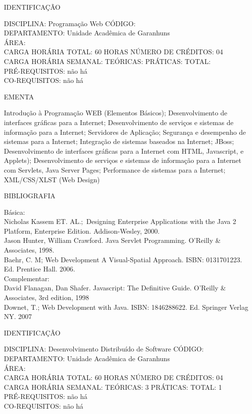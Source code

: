 \documentclass[
	12pt,				%
	openright,			%
  oneside,     %
	a4paper,			%
	chapter=TITLE,		%
	english,			%
	french,				%
	spanish,			%
	brazil				%
	]{abntex2}
\begin{document}
\begin{apendicesenv}
\newpage IDENTIFICAÇÃO

DISCIPLINA: Programação Web CÓDIGO:\\ 
DEPARTAMENTO: Unidade Acadêmica de Garanhuns\\ 
ÁREA: \\
CARGA HORÁRIA TOTAL: 60 HORAS NÚMERO DE CRÉDITOS: 04\\
CARGA HORÁRIA SEMANAL: TEÓRICAS: PRÁTICAS: TOTAL: \\
PRÉ-REQUISITOS: não há\\
CO-REQUISITOS: não há

EMENTA 

Introdução à Programação WEB (Elementos Básicos); Desenvolvimento de interfaces gráficas para a Internet; Desenvolvimento de serviços e sistemas de informação para a Internet; Servidores de Aplicação; Segurança e desempenho de sistemas para a Internet; Integração de sistemas baseados na Internet; JBoss; Desenvolvimento de interfaces gráficas para a Internet com HTML, Javascript, e Applets); Desenvolvimento de serviços e sistemas de informação para a Internet com Servlets, Java Server Pages; Performance de sistemas para a Internet; XML/CSS/XLST (Web Design)

BIBLIOGRAFIA 

Básica:\\
Nicholas Kassem ET. AL.;~Designing Enterprise Applications with the Java
2 Platform, Enterprise Edition. Addison-Wesley, 2000.\\
Jason Hunter, William Crawford. Java Servlet Programming.
O'Reilly \& Associates, 1998.\\
Baehr, C. M; Web Development A Visual-Spatial Approach. ISBN:
0131701223. Ed. Prentice Hall. 2006.\\
Complementar:\\
David Flanagan, Dan Shafer. Javascript: The Definitive Guide.
O'Reilly \& Associates, 3rd edition, 1998\\
Downet, T.; Web Development with Java. ISBN: 1846288622. Ed. Springer
Verlag NY. 2007

\newpage IDENTIFICAÇÃO

DISCIPLINA: Desenvolvimento Distribuído de Software CÓDIGO:\\ 
DEPARTAMENTO: Unidade Acadêmica de Garanhuns\\ 
ÁREA: \\
CARGA HORÁRIA TOTAL: 60 HORAS NÚMERO DE CRÉDITOS: 04\\
CARGA HORÁRIA SEMANAL: TEÓRICAS: 3 PRÁTICAS: TOTAL: 1\\
PRÉ-REQUISITOS: não há\\
CO-REQUISITOS: não há


\end{apendicesenv}
\end{document}
